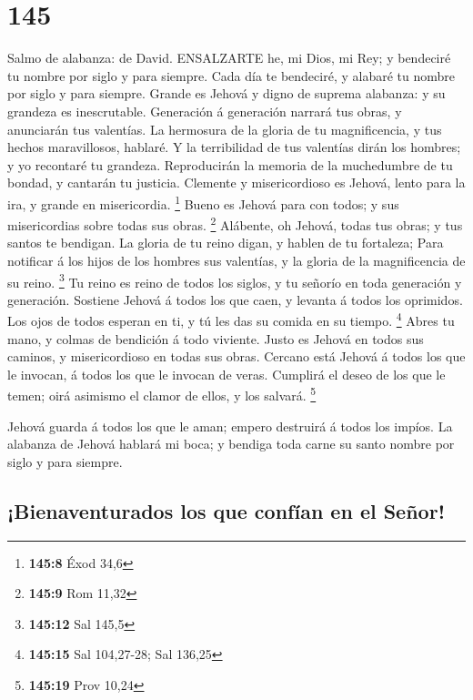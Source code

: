 \hypertarget{section-144}{%
\section{145}\label{section-144}}

 Salmo de alabanza: de David. ENSALZARTE he, mi Dios, mi
Rey; y bendeciré tu nombre por siglo y para siempre.  Cada
día te bendeciré, y alabaré tu nombre por siglo y para siempre.
 Grande es Jehová y digno de suprema alabanza: y su grandeza
es inescrutable.  Generación á generación narrará tus obras,
y anunciarán tus valentías.  La hermosura de la gloria de tu
magnificencia, y tus hechos maravillosos, hablaré.  Y la
terribilidad de tus valentías dirán los hombres; y yo recontaré tu
grandeza.  Reproducirán la memoria de la muchedumbre de tu
bondad, y cantarán tu justicia.  Clemente y misericordioso
es Jehová, lento para la ira, y grande en misericordia. \footnote{\textbf{145:8}
  Éxod 34,6}  Bueno es Jehová para con todos; y sus
misericordias sobre todas sus obras. \footnote{\textbf{145:9} Rom 11,32}
 Alábente, oh Jehová, todas tus obras; y tus santos te
bendigan.  La gloria de tu reino digan, y hablen de tu
fortaleza;  Para notificar á los hijos de los hombres sus
valentías, y la gloria de la magnificencia de su reino. \footnote{\textbf{145:12}
  Sal 145,5}  Tu reino es reino de todos los siglos, y tu
señorío en toda generación y generación.  Sostiene Jehová á
todos los que caen, y levanta á todos los oprimidos.  Los
ojos de todos esperan en ti, y tú les das su comida en su tiempo.
\footnote{\textbf{145:15} Sal 104,27-28; Sal 136,25}  Abres
tu mano, y colmas de bendición á todo viviente.  Justo es
Jehová en todos sus caminos, y misericordioso en todas sus obras.
 Cercano está Jehová á todos los que le invocan, á todos
los que le invocan de veras.  Cumplirá el deseo de los que
le temen; oirá asimismo el clamor de ellos, y los salvará. \footnote{\textbf{145:19}
  Prov 10,24}

 Jehová guarda á todos los que le aman; empero destruirá á
todos los impíos.  La alabanza de Jehová hablará mi boca; y
bendiga toda carne su santo nombre por siglo y para siempre.

\hypertarget{bienaventurados-los-que-confuxedan-en-el-seuxf1or}{%
\subsection{¡Bienaventurados los que confían en el
Señor!}\label{bienaventurados-los-que-confuxedan-en-el-seuxf1or}}

